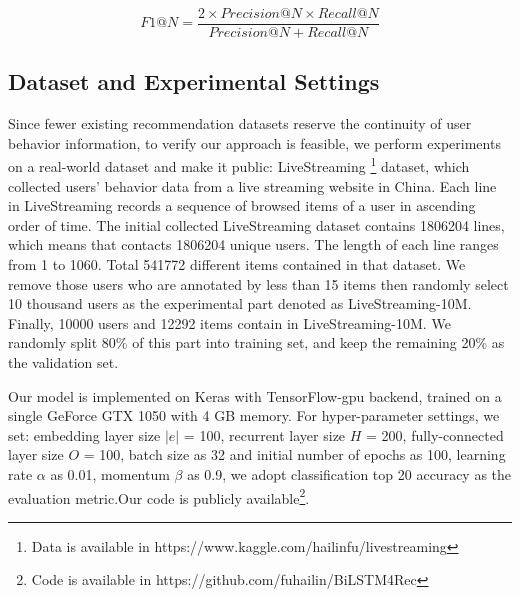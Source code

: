 \documentclass[runningheads]{llncs}
\begin{document}
\begin{equation}
F1@N=\frac{2\times Precision@N\times Recall@N}{Precision@N+Recall@N}
\end{equation}
\subsection{Dataset and Experimental Settings}

Since fewer existing recommendation datasets reserve the continuity of user behavior information, to verify our approach is feasible, we perform experiments on a real-world dataset and make it public: LiveStreaming \footnote{Data is available in https://www.kaggle.com/hailinfu/livestreaming} dataset, which collected users' behavior data from a live streaming website in China. Each line in LiveStreaming records a sequence of browsed items of a user in ascending order of time.  The initial collected LiveStreaming dataset contains 1806204 lines, which means that contacts 1806204 unique users. The length of each line ranges from 1 to 1060. Total 541772 different items contained in that dataset. We remove those users who are annotated by less than 15 items then randomly select 10 thousand users as the experimental part denoted as LiveStreaming-10M. Finally, 10000 users and 12292 items contain in LiveStreaming-10M. We randomly split 80\% of this part into training set, and keep the remaining 20\% as the validation set.

Our model is implemented on Keras with TensorFlow-gpu backend, trained on a single GeForce GTX 1050 with 4 GB memory. For hyper-parameter settings, we set: embedding layer size $|e|$ = 100, recurrent layer size $H$ = 200, fully-connected layer size $O$ = 100, batch size as 32 and initial number of epochs as 100, learning rate $\alpha$ as 0.01, momentum $\beta $ as 0.9, we adopt classification top 20 accuracy as the evaluation metric.Our code is publicly available\footnote{Code is available in https://github.com/fuhailin/BiLSTM4Rec}.
\end{document}
